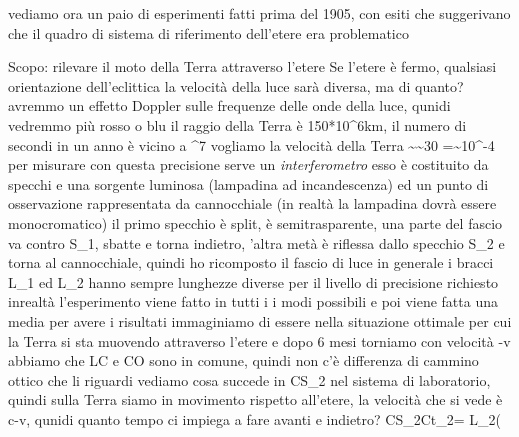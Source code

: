 vediamo ora un paio di esperimenti fatti prima del 1905, con esiti che suggerivano che il quadro di sistema di riferimento dell'etere era problematico
\begin{experiment}
	Scopo: rilevare il moto della Terra attraverso l'etere
	Se l'etere è fermo, qualsiasi orientazione dell'eclittica la velocità della luce sarà diversa, ma di quanto?
	avremmo un effetto Doppler sulle frequenze delle onde della luce, qunidi vedremmo più rosso o blu
	il raggio della Terra è 150*10^6km, il numero di secondi in un anno è vicino a ^7 vogliamo la velocità della Terra
		\sim {}\sim 30
		=\beta\sim 10^{-4}
	per misurare con questa precisione serve un \textit{interferometro}
	esso è costituito da specchi e una sorgente luminosa (lampadina ad incandescenza) ed un punto di osservazione rappresentata da cannocchiale (in realtà la lampadina dovrà essere monocromatico)
	il primo specchio è split, è semitrasparente, una parte del fascio va contro S_1, sbatte e torna indietro, 'altra metà è riflessa dallo specchio S_2 e torna al cannocchiale, quindi ho ricomposto il fascio di luce
	in generale i bracci L_1 ed L_2 hanno sempre lunghezze diverse per il livello di precisione richiesto
	inrealtà l'esperimento viene fatto in tutti i i modi possibili e poi viene fatta una media per avere i risultati
	immaginiamo di essere nella situazione ottimale per cui la Terra si sta muovendo attraverso l'etere e dopo 6 mesi torniamo con velocità -\vba v
	abbiamo che LC e CO sono in comune, quindi non c'è differenza di cammino ottico che li riguardi
	vediamo cosa succede in CS_2 nel sistema di laboratorio, quindi sulla Terra
		siamo in movimento rispetto all'etere, la velocità che si vede è c-v, qunidi quanto tempo ci impiega a fare avanti e indietro?
			CS_2C\colon t_2= L_2\left( 
\end{experiment}
